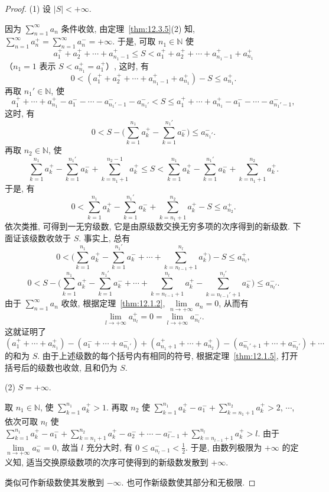 \begin{proof}
(1) 设 $|S|<+\infty$.

因为 $\sum_{n=1}^{\infty}a_{n}$ 条件收敛, 由定理~\ref{thm:12.3.5}(2) 知, $\sum_{n=1}^{\infty}a_{n}^{+}=\sum_{n=1}^{\infty}a_{n}^{-}=+\infty$. 于是, 可取 $n_{1}\in\mathbb{N}$ 使
\[
  a_{1}^{+}+a_{2}^{+}+\cdots+a_{n_{1}-1}^{+}\leqslant S
  <a_{1}^{+}+a_{2}^{+}+\cdots+a_{n_{1}-1}^{+}+a_{n_{1}}^{+}
\]
（$n_{1}=1$ 表示 $S<a_{n_{1}}^{+}=a_{1}^{+}$）, 这时, 有
\[
  0<(a_{1}^{+}+a_{2}^{+}+\cdots+a_{n_{1}-1}^{+}+a_{n_{1}}^{+})-S\leqslant a_{n_{1}}^{+}.
\]
再取 $n_{1}'\in\mathbb{N}$, 使
\[
  a_{1}^{+}+\cdots+a_{n_{1}}^{+}-a_{1}^{-}-\cdots-a_{n_{1}'-1}^{-}-a_{n_{1}'}^{-}
  <S\leqslant a_{1}^{+}+\cdots+a_{n_{1}}^{+}-a_{1}^{-}-\cdots-a_{n_{1}'-1}^{-},
\]
这时, 有
\[
  0<S-\biggl(\sum_{k=1}^{n_{1}}a_{k}^{+}-\sum_{k=1}^{n_{1}'}a_{k}^{-}\biggr)\leqslant a_{n_{1}'}^{-}.
\]
再取 $n_{2}\in\mathbb{N}$, 使
\[
  \sum_{k=1}^{n_{1}}a_{k}^{+}-\sum_{k=1}^{n_{1}'}a_{k}^{-}+\sum_{k=n_{1}+1}^{n_{2}-1}a_{k}^{+}
  \leqslant S
  <\sum_{k=1}^{n_{1}}a_{k}^{+}-\sum_{k=1}^{n_{1}'}a_{k}^{-}+\sum_{k=n_{1}+1}^{n_{2}}a_{k}^{+}.
\]
于是, 有
\[
  0<\sum_{k=1}^{n_{1}}a_{k}^{+}-\sum_{k=1}^{n_{1}'}a_{k}^{-}
  +\sum_{k=n_{1}+1}^{n_{2}}a_{k}^{+}-S\leqslant a_{n_{2}}^{+}.
\]
依次类推, 可得到一无穷级数, 它是由原级数交换无穷多项的次序得到的新级数. 下面证该级数收敛于 $S$. 事实上, 总有
\[
  0<\biggl(\sum_{k=1}^{n_{1}}a_{k}^{+}-\sum_{k=1}^{n_{1}'}a_{k}^{-}
  +\cdots+\sum_{k=n_{l-1}+1}^{n_{l}}a_{k}^{+}\biggr)-S\leqslant a_{n_{l}}^{+},
\]
\[
  0<S-\biggl(\sum_{k=1}^{n_{1}}a_{k}^{+}-\sum_{k=1}^{n_{1}'}a_{k}^{-}
  +\cdots+\sum_{k=n_{l-1}+1}^{n_{l}}a_{k}^{+}
  -\sum_{k=n_{l-1}'+1}^{n_{l}'}a_{k}^{-}\biggr)\leqslant a_{n_{l}'}^{-}.
\]
由于 $\sum_{n=1}^{\infty}a_{n}$ 收敛, 根据定理~\ref{thm:12.1.2}, $\lim\limits_{n\to+\infty}a_{n}=0$, 从而有
\[
  \lim_{l\to+\infty}a_{n_{l}}^{+}=0=\lim_{l\to+\infty}a_{n_{l}'}^{-}.
\]
这就证明了
\[
  (a_{1}^{+}+\cdots+a_{n_{1}}^{+})-(a_{1}^{-}+\cdots+a_{n_{1}'}^{-})
  +(a_{n_{1}+1}^{+}+\cdots+a_{n_{2}}^{+})-(a_{n_{1}'+1}^{-}+\cdots+a_{n_{2}'}^{-})+\cdots
\]
的和为 $S$. 由于上述级数的每个括号内有相同的符号, 根据定理~\ref{thm:12.1.5}, 打开括号后的级数也收敛, 且和仍为 $S$.

(2) $S=+\infty$.

取 $n_{1}\in\mathbb{N}$, 使 $\sum_{k=1}^{n_{1}}a_{k}^{+}>1$. 再取 $n_{2}$ 使 $\sum_{k=1}^{n_{1}}a_{k}^{+}-a_{1}^{-}+\sum_{k=n_{1}+1}^{n_{2}}a_{k}^{+}>2$, $\cdots$, 依次可取 $n_{l}$ 使 $\sum_{k=1}^{n_{1}}a_{k}^{+}-a_{1}^{-}+\sum_{k=n_{1}+1}^{n_{2}}a_{k}^{+}-a_{2}^{-}+\cdots-a_{l-1}^{-}+\sum_{k=n_{l-1}+1}^{n_{l}}a_{k}^{+}>l$. 由于 $\lim\limits_{n\to+\infty}a_{n}^{-}=0$, 故当 $l$ 充分大时, 有 $0\leqslant a_{n_{l}-1}^{-}<\frac{1}{2}$. 于是, 由数列极限为 $+\infty$ 的定义知, 适当交换原级数项的次序可使得到的新级数发散到 $+\infty$.

类似可作新级数使其发散到 $-\infty$. 也可作新级数使其部分和无极限.
\end{proof}

